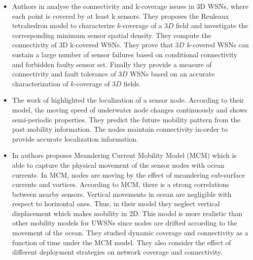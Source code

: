 \documentclass[12pt]{article}
\begin{document}
\begin{itemize}

 \item Authors in \cite{ammari2010study} analyse  the connectivity and k-coverage issues in 3D WSNs, where each point is covered by at least k sensors. They proposes  the
Reuleaux tetrahedron model to characterize $k$-coverage of a $3D$ field and investigate the corresponding minimum sensor spatial
density.
They compute the connectivity of 3D k-covered WSNs. They prove that $3D$ $k$-covered WSNs can sustain a large number of
sensor failures based on conditional connectivity and forbidden faulty sensor set. Finally they provide a measure of connectivity and
fault tolerance of $3D$ WSNs based on an accurate characterization of $k$-coverage of $3D$ fields.



\item The work of \cite{zhou2011scalable} highlighted the localization of a sensor node. According to their model, the moving speed of underwater node changes continuously and shows semi-periodic properties. They predict the future mobility pattern from the past mobility information. The nodes maintain connectivity in-order to provide accurate localization information.

 \item In \cite{caruso2008meandering} authors proposes Meandering Current Mobility Model (MCM) which is able to capture the physical movement of the sensor nodes with ocean currents. In MCM, nodes are moving by the effect of meandering sub-surface currents and vortices. According to MCM, there is a strong correlations between nearby sensors.
  Vertical movements in ocean are negligible with respect to horizontal ones. Thus, in their model they neglect vertical displacement which makes mobility in 2D. This model is more realistic than other mobility models \cite{jaffe2006sensor}\cite{zhou2011scalable} for UWSNs since nodes are drifted according to the movement of the ocean. They studied dynamic coverage and connectivity as a function of time under the MCM model. They also consider the effect of different deployment strategies on network coverage and connectivity.


\end{itemize}
\end{document}
